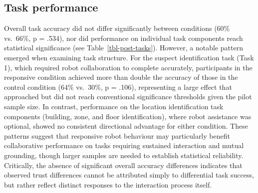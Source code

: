 \documentclass[
  letterpaper,
  DIV=11,
  numbers=noendperiod]{scrartcl}
\begin{document}
\subsection{Task performance}\label{task-performance}

Overall task accuracy did not differ significantly between conditions
(60\% vs.~66\%, p = .534), nor did performance on individual task
components reach statistical significance (see
Table~\ref{tbl-post-tasks}). However, a notable pattern emerged when
examining task structure. For the suspect identification task (Task 1),
which required robot collaboration to complete accurately, participants
in the responsive condition achieved more than double the accuracy of
those in the control condition (64\% vs.~30\%, p = .106), representing a
large effect that approached but did not reach conventional significance
thresholds given the pilot sample size. In contrast, performance on the
location identification task components (building, zone, and floor
identification), where robot assistance was optional, showed no
consistent directional advantage for either condition. These patterns
suggest that responsive robot behaviour may particularly benefit
collaborative performance on tasks requiring sustained interaction and
mutual grounding, though larger samples are needed to establish
statistical reliability. Critically, the absence of significant overall
accuracy differences indicates that observed trust differences cannot be
attributed simply to differential task success, but rather reflect
distinct responses to the interaction process itself.

\begin{table}

\caption{\label{tbl-post-tasks}}


\end{table}%
\end{document}

